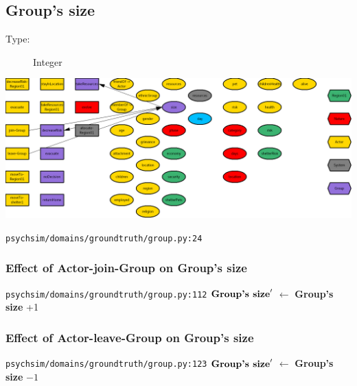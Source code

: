 \documentclass{article}%
\begin{document}
%
\subsection{Group's size}%
\label{subsec:Group's size}%
\begin{description}%
\item[Type:]%
Integer%
\end{description}%
\includegraphics[width=\textwidth]{images/sizeOfGroup.png}%
\begin{flushleft}%
\verb|psychsim/domains/groundtruth/group.py:24|%
\end{flushleft}%
\subsubsection{Effect of Actor{-}join{-}Group on Group's size}%
\label{ssubsec:Effect of Actor{-}join{-}Group on Group's size}%
\begin{flushleft}%
\verb|psychsim/domains/groundtruth/group.py:112|%
\linebreak%
$\mbox{\textbf{Group's size}} '$%
$\leftarrow$%
\textbf{Group's size}%
+1%
\end{flushleft}

%
\subsubsection{Effect of Actor{-}leave{-}Group on Group's size}%
\label{ssubsec:Effect of Actor{-}leave{-}Group on Group's size}%
\begin{flushleft}%
\verb|psychsim/domains/groundtruth/group.py:123|%
\linebreak%
$\mbox{\textbf{Group's size}} '$%
$\leftarrow$%
\textbf{Group's size}%
${-}1$%
\end{flushleft}

%
\end{document}
